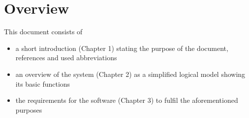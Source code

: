 \section{Overview}

This document consists of
\begin{itemize}
\item a short introduction (Chapter 1) stating the purpose of the document, references and used abbreviations
\item an overview of the system (Chapter 2) as a simplified logical model showing its basic functions
\item the requirements for the software (Chapter 3) to fulfil the aforementioned purposes
\end{itemize}


